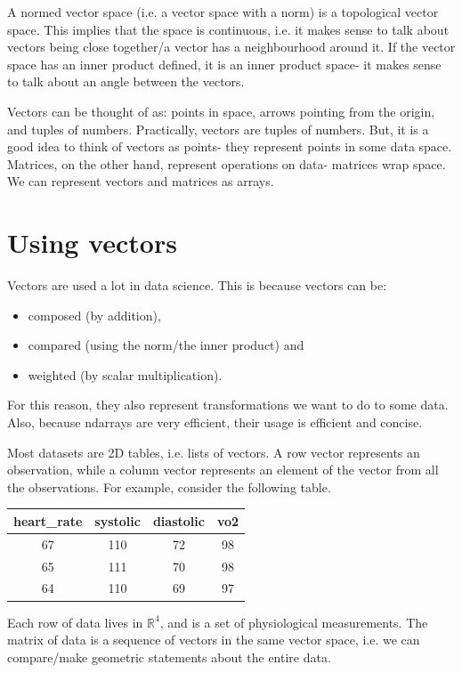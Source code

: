 \documentclass[a4paper, openany]{memoir}
\begin{document}
    A normed vector space (i.e. a vector space with a norm) is a topological vector space. This implies that the space is continuous, i.e. it makes sense to talk about vectors being close together/a vector has a neighbourhood around it. If the vector space has an inner product defined, it is an inner product space- it makes sense to talk about an angle between the vectors.

    Vectors can be thought of as: points in space, arrows pointing from the origin, and tuples of numbers. Practically, vectors are tuples of numbers. But, it is a good idea to think of vectors as points- they represent points in some data space. Matrices, on the other hand, represent operations on data- matrices wrap space. We can represent vectors and matrices as arrays.
    \newpage

    \section{Using vectors}
    Vectors are used a lot in data science. This is because vectors can be:
    \begin{itemize}
        \item composed (by addition),
        \item compared (using the norm/the inner product) and
        \item weighted (by scalar multiplication).
    \end{itemize}
    For this reason, they also represent transformations we want to do to some data. Also, because ndarrays are very efficient, their usage is efficient and concise.

    Most datasets are 2D tables, i.e. lists of vectors. A row vector represents an observation, while a column vector represents an element of the vector from all the observations. For example, consider the following table.
    \begin{table}[H]
        \centering
        \begin{tabular}{|c|c|c|c|}
            \hline
            heart\_rate & systolic & diastolic & vo2 \\
            \hline
            67 & 110 & 72 & 98 \\
            65 & 111 & 70 & 98 \\
            64 & 110 & 69 & 97 \\
            \hline
        \end{tabular}
    \end{table}
    \noindent Each row of data lives in $\mathbb{R}^4$, and is a set of physiological measurements. The matrix of data is a sequence of vectors in the same vector space, i.e. we can compare/make geometric statements about the entire data.
\end{document}
